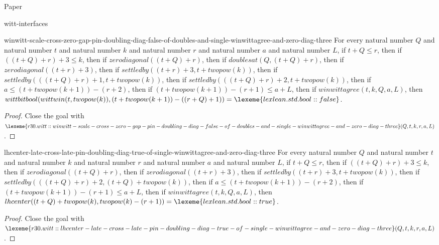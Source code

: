 \begin{lexlean}{Paper}
\begin{section}{witt-interfaces}
  \begin{theorem}{winwitt-scale-cross-zero-gap-pin-doubling-diag-false-of-doubles-and-single-winwittagree-and-zero-diag-three}
  For every natural number \(Q\) and natural number \(t\) and natural number \(k\) and natural number \(r\) and natural number \(a\) and natural number \(L\), if \(t + Q ≤ r\), then if \(((t + Q) + r) + 3 ≤ k\), then if \(zerodiagonal((t + Q) + r)\), then if \(doublesat(Q, (t + Q) + r)\), then if \(zerodiagonal((t + r) + 3)\), then if \(settledby((t + r) + 3, t + twopow(k))\), then if \(settledby(((t + Q) + r) + 1, t + twopow(k))\), then if \(settledby(((t + Q) + r) + 2, t + twopow(k))\), then if \(a ≤ (t + twopow(k + 1)) - (r + 2)\), then if \((t + twopow(k + 1)) - (r + 1) ≤ a + L\), then if \(winwittagree(t, k, Q, a, L)\), then \(wittbitbool(wittwin(t, twopow(k)), (t + twopow(k + 1)) - ((r + Q) + 1)) = \lexeme{lexlean.std.bool::false}\).
  \begin{proof}
  Close the goal with \(\lexeme{r30.witt::winwitt-scale-cross-zero-gap-pin-doubling-diag-false-of-doubles-and-single-winwittagree-and-zero-diag-three}(Q, t, k, r, a, L)\).
  \end{proof}
  \end{theorem}

  \begin{theorem}{lhcenter-late-cross-late-pin-doubling-diag-true-of-single-winwittagree-and-zero-diag-three}
  For every natural number \(Q\) and natural number \(t\) and natural number \(k\) and natural number \(r\) and natural number \(a\) and natural number \(L\), if \(t + Q ≤ r\), then if \(((t + Q) + r) + 3 ≤ k\), then if \(zerodiagonal((t + Q) + r)\), then if \(zerodiagonal((t + r) + 3)\), then if \(settledby((t + r) + 3, t + twopow(k))\), then if \(settledby(((t + Q) + r) + 2, (t + Q) + twopow(k))\), then if \(a ≤ (t + twopow(k + 1)) - (r + 2)\), then if \((t + twopow(k + 1)) - (r + 1) ≤ a + L\), then if \(winwittagree(t, k, Q, a, L)\), then \(lhcenter((t + Q) + twopow(k), twopow(k) - (r + 1)) = \lexeme{lexlean.std.bool::true}\).
  \begin{proof}
  Close the goal with \(\lexeme{r30.witt::lhcenter-late-cross-late-pin-doubling-diag-true-of-single-winwittagree-and-zero-diag-three}(Q, t, k, r, a, L)\).
  \end{proof}
  \end{theorem}


\end{section}
\end{lexlean}
